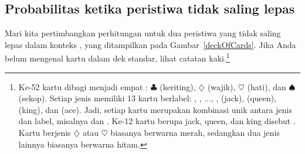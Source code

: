 \subsection{Probabilitas ketika peristiwa tidak saling lepas}

Mari kita pertimbangkan perhitungan untuk dua peristiwa yang tidak saling lepas dalam konteks , yang ditampilkan pada Gambar~\ref{deckOfCards}. Jika Anda belum mengenal kartu dalam dek standar, lihat catatan kaki.\footnote{Ke-52 kartu dibagi menjadi empat : $\clubsuit$ (keriting), {\color{redcards}$\diamondsuit$} (wajik), {\color{redcards}$\heartsuit$} (hati), dan $\spadesuit$ (sekop). Setiap jenis memiliki 13 kartu berlabel: , , ..., ,  (jack),  (queen),  (king), dan  (ace). Jadi, setiap kartu merupakan kombinasi unik antara jenis dan label, misalnya {\color{redcards}} dan . Ke-12 kartu berupa jack, queen, dan king disebut . Kartu berjenis {\color{redcards}$\diamondsuit$} atau {\color{redcards}$\heartsuit$} biasanya berwarna {\color{redcards}merah}, sedangkan dua jenis lainnya biasanya berwarna hitam.}

